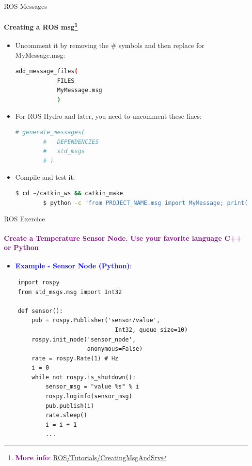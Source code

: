 \documentclass[aspectratio=169]{beamer}
\begin{document}
\begin{frame}[fragile]{ROS Messages}
	\framesubtitle{Creating a ROS msg\footnote[frame]{\textcolor{purple}{\textbf{More info}: \href{http://wiki.ros.org/ROS/Tutorials/CreatingMsgAndSrv}{ROS/Tutorials/CreatingMsgAndSrv}}}}
    \begin{itemize}
        \item Uncomment it by removing the \# symbols and then replace for MyMessage.msg:
		\begin{lstlisting}[language=bash]
		add_message_files(
			FILES
			MyMessage.msg
			)
		\end{lstlisting}
		\item For ROS Hydro and later, you need to uncomment these lines:
		\begin{lstlisting}[language=bash]
	# generate_messages(
		#   DEPENDENCIES
		#   std_msgs
		# )
		\end{lstlisting}
		\item Compile and test it:
		\begin{lstlisting}[language=bash]
		$ cd ~/catkin_ws && catkin_make
		$ python -c "from PROJECT_NAME.msg import MyMessage; print(MyMessage)"
		\end{lstlisting}
    \end{itemize}

\end{frame}


\begin{frame}[t,fragile]{ROS Exercice}
	\framesubtitle{\textcolor{purple}{Create a Temperature Sensor Node. Use your favorite language C++ or Python}}
	\begin{minipage}{0.6\textwidth}
		\begin{itemize}
			\item \textcolor{blue}{\textbf{Example - Sensor Node (Python)}}:
		\end{itemize}
	\begin{lstlisting}
	import rospy
	from std_msgs.msg import Int32

	def sensor():
		pub = rospy.Publisher('sensor/value', 
								Int32, queue_size=10)
		rospy.init_node('sensor_node',
						anonymous=False)
		rate = rospy.Rate(1) # Hz
		i = 0
		while not rospy.is_shutdown():
			sensor_msg = "value %s" % i
			rospy.loginfo(sensor_msg)
			pub.publish(i)
			rate.sleep()
			i = i + 1
			...
    \end{lstlisting}
\end{minipage}
\begin{minipage}{0.4\textwidth}
	
\end{minipage}
\end{frame}
\end{document}
